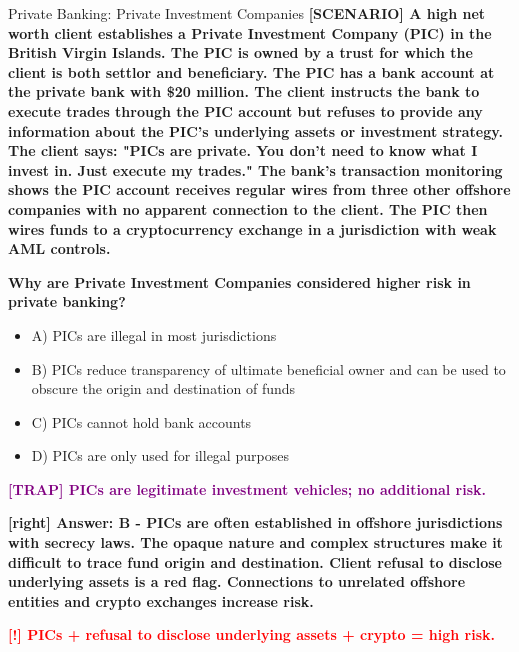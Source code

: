 \documentclass[11pt,a4paper]{beamer}
\newcommand{\redflag}[1]{\textcolor{red}{\textbf{[!] #1}}}
\newcommand{\trap}[1]{\textcolor{purple}{\textbf{[TRAP] #1}}}
\newcommand{\correct}[1]{\textcolor{green!50!black}{\textbf{[right] #1}}}
\newcommand{\scenario}[1]{\textcolor{blue!70!black}{\textbf{[SCENARIO] #1}}}
\begin{document}
	
	\begin{frame}{Private Banking: Private Investment Companies}
		\tiny
		\scenario{A high net worth client establishes a Private Investment Company (PIC) in the British Virgin Islands. The PIC is owned by a trust for which the client is both settlor and beneficiary. The PIC has a bank account at the private bank with \$20 million. The client instructs the bank to execute trades through the PIC account but refuses to provide any information about the PIC's underlying assets or investment strategy. The client says: "PICs are private. You don't need to know what I invest in. Just execute my trades." The bank's transaction monitoring shows the PIC account receives regular wires from three other offshore companies with no apparent connection to the client. The PIC then wires funds to a cryptocurrency exchange in a jurisdiction with weak AML controls.}
		
		\vspace{0.02cm}
		\textbf{Why are Private Investment Companies considered higher risk in private banking?}
		\vspace{0.02cm}
		
		\begin{itemize}
			\item A) PICs are illegal in most jurisdictions
			\item B) PICs reduce transparency of ultimate beneficial owner and can be used to obscure the origin and destination of funds
			\item C) PICs cannot hold bank accounts
			\item D) PICs are only used for illegal purposes
		\end{itemize}
		
		\vspace{0.02cm}
		\trap{PICs are legitimate investment vehicles; no additional risk.}
		
		\vspace{0.02cm}
		\correct{Answer: B - PICs are often established in offshore jurisdictions with secrecy laws. The opaque nature and complex structures make it difficult to trace fund origin and destination. Client refusal to disclose underlying assets is a red flag. Connections to unrelated offshore entities and crypto exchanges increase risk.}
		
		\vspace{0.02cm}
		\redflag{PICs + refusal to disclose underlying assets + crypto = high risk.}
	\end{frame}
	
\end{document}
